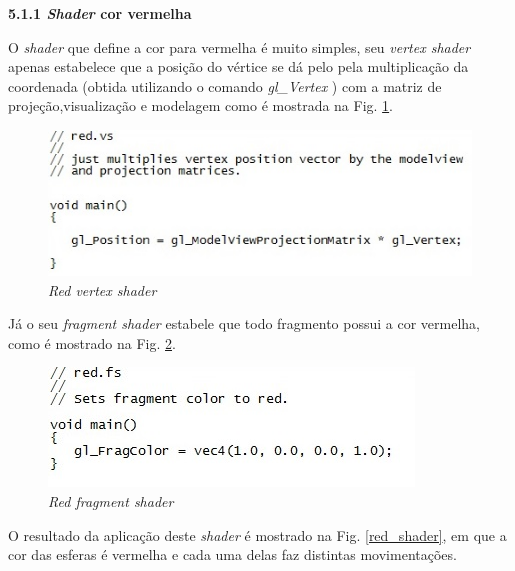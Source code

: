 \begin{description}

	\item \textbf{5.1.1 \textit{Shader} cor vermelha}

	O \textit{shader} que define a cor para vermelha é muito simples,  seu \textit{vertex shader} apenas estabelece que a posição do vértice  se dá pelo pela multiplicação da coordenada (obtida utilizando o comando \textit{gl\_Vertex} ) com a matriz de projeção,visualização e modelagem como é mostrada na Fig. \ref{red_vs}. 

	\begin{figure}[h]
	\centering
		\includegraphics[keepaspectratio=true,scale=1.0]{figuras/red_vs.jpg}
	\caption{\textit{Red vertex shader}}
	\label{red_vs}
	\end{figure}

	Já o seu \textit{fragment shader} estabele que todo fragmento possui a cor vermelha, como é mostrado na Fig. \ref{red_fs}.
	
	
	\begin{figure}[h]
	\centering
		\includegraphics[keepaspectratio=true,scale=1.0]{figuras/red_fs.jpg}
	\caption{\textit{Red fragment shader}}
	\label{red_fs}
	\end{figure}

	O resultado da aplicação deste \textit{shader} é mostrado na Fig. \ref{red_shader}, em que a cor das esferas é vermelha e cada uma delas faz distintas movimentações. 


\end{description}
